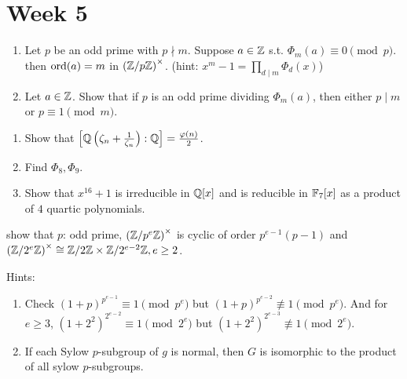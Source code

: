 
\section{Week 5}

\begin{exercise} \mbox{}
  \begin{enumerate}
    \item Let $p$ be an odd prime with $p \nmid m$.
      Suppose $a \in \mathbb{Z}$ s.t. $\Phi_m(a) \equiv 0 \pmod p$. then
      $\operatorname{ord}(a) = m$ in $\left({\mathbb{Z}}/{p\mathbb{Z}}\right)^\times$.
      (hint: $x^m - 1 = \prod_{d\mid m} \Phi_d(x)$)
    \item Let $a\in \mathbb{Z}$. Show that if $p$ is an odd prime dividing $\Phi_m(a)$,
      then either $p \mid m$ or $p \equiv 1 \pmod m$.
  \end{enumerate}
\end{exercise}

\begin{exercise} \mbox{}
  \begin{enumerate}
    \item Show that $\left[\mathbb{Q}\left(\zeta_n + \frac{1}{\zeta_n}\right) : \mathbb{Q}\right]
      = \frac{\varphi(n)}{2}$.
    \item Find $\Phi_8, \Phi_9$.
    \item Show that $x^{16} + 1$ is irreducible in $\mathbb{Q}[x]$ and is reducible
      in $\mathbb{F}_7[x]$ as a product of $4$ quartic polynomials.
  \end{enumerate}
\end{exercise}

\begin{exercise}
  show that $p$: odd prime, $\left({\mathbb{Z}}/{p^e\mathbb{Z}}\right)^\times$ is cyclic
  of order $p^{e-1}(p-1)$ and $\left({\mathbb{Z}}/{2^e\mathbb{Z}}\right)^\times \cong
  {\mathbb{Z}}/{2\mathbb{Z}} \times {\mathbb{Z}}/{2^{e-2}\mathbb{Z}}, e\ge 2$.
  
  Hints:
  \begin{enumerate}
    \item Check $(1+p)^{p^{e-1}} \equiv 1 \pmod{p^e}$ but
      $(1+p)^{p^{e-2}} \not\equiv 1 \pmod{p^e}$. And for $e \ge 3$,
      $(1+2^2)^{2^{e-2}} \equiv 1 \pmod{2^e}$ but
      $(1+2^2)^{2^{e-3}} \not\equiv 1 \pmod{2^e}$.
    \item If each Sylow $p$-subgroup of $g$ is normal, then $G$ is isomorphic
      to the product of all sylow $p$-subgroups.
  \end{enumerate}
\end{exercise}

